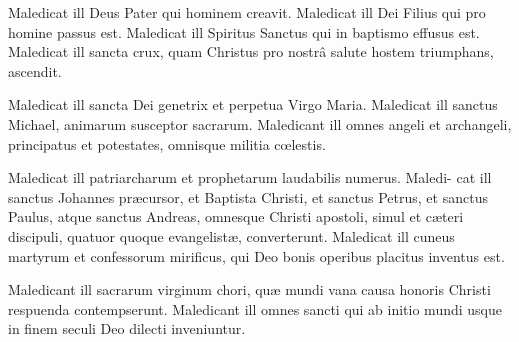 \documentclass{article}
\begin{document}
Maledicat ill Deus Pater qui homi\-nem creavit. Maledicat
ill Dei Filius qui pro homine passus est.  Maledicat ill
Spiritus Sanctus qui in baptismo effusus est.  Maledicat ill sancta
crux, quam Christus pro nostrâ salute hostem triumphans, ascendit.

Maledicat ill sancta Dei genetrix et perpetua Virgo Maria. Maledicat ill sanctus
Michael, animarum susceptor sa\-crarum. Maledicant ill omnes angeli et archangeli,
principatus et potestates, omnisque militia cœlestis.


\newpage
\noindent
{}

\noindent
{}
\stick{\lqq curse him.” [Our armies swore ter-}
\stick{dog so.]\hfill}

\newpage
Maledicat ill patriarcharum et pro\-phetarum laudabilis numerus.
Maledi-\break
cat ill
sanctus Johannes præcursor, et Baptista Christi, et sanctus Petrus, et sanctus
Paulus, atque sanctus Andreas, omnesque Christi apostoli, simul et cæteri discipuli,
quatuor quoque evangelistæ,\break
{}
converterunt. Maledicat ill cuneus martyrum et confessorum mirificus, qui Deo bonis operibus
placitus inventus est.

Maledicant ill sacrarum virginum chori, quæ mundi vana causa honoris Christi
respuenda contempserunt. Male\-dicant ill omnes sancti qui ab initio mundi usque in
finem seculi Deo dilecti inveniuntur.

\end{document}
